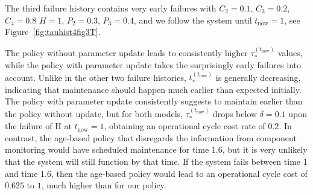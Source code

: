\documentclass[authoryear]{elsarticle}
\def\tnow{t_\text{now}}
\newcommand{\tausnow}{\tau_*^{(\tnow)}}
\newcommand{\tthresh}{\tau_{\text{thresh}}}
\newcommand{\tstarnow}{t_*^{(\tnow)}}
\begin{document}
%
%
The third failure history contains very early failures
with $C_2 = 0.1$, $C_3 = 0.2$, $C_4 = 0.8$ $H = 1$, $P_2 = 0.3$, $P_3 = 0.4$,
and we follow the system until $\tnow = 1$,
see Figure~\ref{fig:tauhist4fig3T}.

The policy without parameter update leads to consistently higher $\tausnow$ values,
while the policy with parameter update takes the surprisingly early failures into account.
Unlike in the other two failure histories, $\tstarnow$ is generally decreasing,
indicating that maintenance should happen much earlier than expected initially.
The policy with parameter update consistently suggests to maintain earlier than the policy without update,
but for both models, $\tausnow$ drops below $\delta = 0.1$ upon the failure of H at $\tnow = 1$,
obtaining an operational cycle cost rate of $0.2$.
In contrast, 
the age-based policy that disregards the information from component monitoring
would have scheduled maintenance for time $1.6$,
but it is very unlikely that the system will still function by that time.
If the system fails between time 1 and time 1.6,
then the age-based policy would lead to an operational cycle cost of $0.625$ to $1$,
much higher than for our policy.
\end{document}
